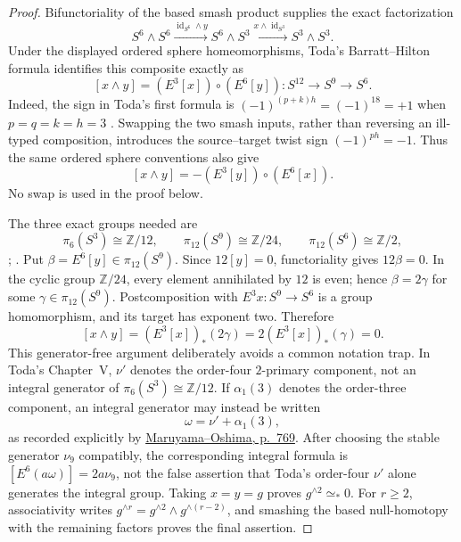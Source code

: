 \documentclass[11pt,letterpaper]{article}
\numberwithin{equation}{section}
\theoremstyle{definition}
\theoremstyle{remark}
\begin{document}
\begin{proof}
Bifunctoriality of the based smash product supplies the exact factorization
\[
 S^6\wedge S^6
 \xrightarrow{\operatorname{id}_{S^6}\wedge y}
 S^6\wedge S^3
 \xrightarrow{x\wedge\operatorname{id}_{S^3}}
 S^3\wedge S^3 .
\]
Under the displayed ordered sphere homeomorphisms, Toda's Barratt--Hilton
formula identifies this composite exactly as
\[
 [x\wedge y]=(E^3[x])\circ(E^6[y]):
 S^{12}\longrightarrow S^9\longrightarrow S^6.
\]
Indeed, the sign in Toda's first formula is
\((-1)^{(p+k)h}=(-1)^{18}=+1\) when \(p=q=k=h=3\)
\citep[Proposition~3.1]{Toda1962}.
Swapping the two smash inputs, rather than reversing an ill-typed
composition, introduces the source--target twist sign
\((-1)^{ph}=-1\).  Thus the same ordered sphere conventions also give
\[
 [x\wedge y]=-(E^3[y])\circ(E^6[x]).
\]
No swap is used in the proof below.

The three exact groups needed are
\[
 \pi_6(S^3)\cong\mathbb Z/12,
 \qquad
 \pi_{12}(S^9)\cong\mathbb Z/24,
 \qquad
 \pi_{12}(S^6)\cong\mathbb Z/2,
\]
\citep[opening table, p.~339]{Hatcher2002};
\citep[Table~1, p.~113]{IsaksenWangXu2023}.
Put \(\beta=E^6[y]\in\pi_{12}(S^9)\).  Since \(12[y]=0\),
functoriality gives \(12\beta=0\).  In the cyclic group
\(\mathbb Z/24\), every element annihilated by \(12\) is even; hence
\(\beta=2\gamma\) for some \(\gamma\in\pi_{12}(S^9)\).  Postcomposition
with \(E^3x:S^9\to S^6\) is a group homomorphism, and its target has
exponent two.  Therefore
\[
 [x\wedge y]=(E^3[x])_*(2\gamma)
 =2(E^3[x])_*(\gamma)=0.
\]
This generator-free argument deliberately avoids a common notation trap.
In Toda's Chapter~V, \(\nu'\) denotes the order-four \(2\)-primary
component, not an integral generator of
\(\pi_6(S^3)\cong\mathbb Z/12\).  If
\(\alpha_1(3)\) denotes the order-three component, an integral generator
may instead be written
\[
 \omega=\nu'+\alpha_1(3),
\]
as recorded explicitly by
\href{https://doi.org/10.2969/jmsj/06030767}{Maruyama--Oshima,
p.~769}.  After choosing the stable generator \(\nu_9\) compatibly, the
corresponding integral formula is
\([E^6(a\omega)]=2a\nu_9\), not the false assertion that Toda's
order-four \(\nu'\) alone generates the integral group.
Taking \(x=y=g\) proves \(g^{\wedge2}\simeq_*0\).  For \(r\geq2\),
associativity writes
\(g^{\wedge r}=g^{\wedge2}\wedge g^{\wedge(r-2)}\), and smashing the
based null-homotopy with the remaining factors proves the final assertion.
\end{proof}
\end{document}
